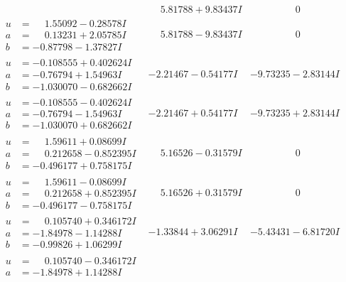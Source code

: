 \documentclass[1p]{elsarticle_modified}
\theoremstyle{definition}
\begin{document}
$$\begin{array}{c|c|c}
 & \phantom{-}5.81788 + 9.83437 I & \phantom{-0.000000 } 0 \\ \hline\begin{aligned}
u &= \phantom{-}1.55092 - 0.28578 I \\
a &= \phantom{-}0.13231 + 2.05785 I \\
b &= -0.87798 - 1.37827 I\end{aligned}
 & \phantom{-}5.81788 - 9.83437 I & \phantom{-0.000000 } 0 \\ \hline\begin{aligned}
u &= -0.108555 + 0.402624 I \\
a &= -0.76794 + 1.54963 I \\
b &= -1.030070 - 0.682662 I\end{aligned}
 & -2.21467 - 0.54177 I & -9.73235 - 2.83144 I \\ \hline\begin{aligned}
u &= -0.108555 - 0.402624 I \\
a &= -0.76794 - 1.54963 I \\
b &= -1.030070 + 0.682662 I\end{aligned}
 & -2.21467 + 0.54177 I & -9.73235 + 2.83144 I \\ \hline\begin{aligned}
u &= \phantom{-}1.59611 + 0.08699 I \\
a &= \phantom{-}0.212658 - 0.852395 I \\
b &= -0.496177 + 0.758175 I\end{aligned}
 & \phantom{-}5.16526 - 0.31579 I & \phantom{-0.000000 } 0 \\ \hline\begin{aligned}
u &= \phantom{-}1.59611 - 0.08699 I \\
a &= \phantom{-}0.212658 + 0.852395 I \\
b &= -0.496177 - 0.758175 I\end{aligned}
 & \phantom{-}5.16526 + 0.31579 I & \phantom{-0.000000 } 0 \\ \hline\begin{aligned}
u &= \phantom{-}0.105740 + 0.346172 I \\
a &= -1.84978 - 1.14288 I \\
b &= -0.99826 + 1.06299 I\end{aligned}
 & -1.33844 + 3.06291 I & -5.43431 - 6.81720 I \\ \hline\begin{aligned}
u &= \phantom{-}0.105740 - 0.346172 I \\
a &= -1.84978 + 1.14288 I \\

\end{aligned}
\end{array}$$
\end{document}
